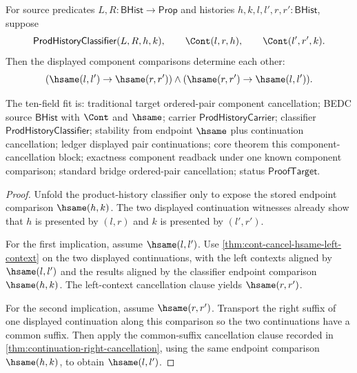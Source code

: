 \begin{theorem}
\label{thm:prod-history-classifier-hsame-component-cancellation}
For source predicates $L,R:\mathsf{BHist}\to\mathsf{Prop}$ and histories
$h,k,l,l',r,r':\mathsf{BHist}$, suppose
$$
\mathsf{ProdHistoryClassifier}(L,R,h,k),
\qquad
\Cont(l,r,h),
\qquad
\Cont(l',r',k).
$$
Then the displayed component comparisons determine each other:
$$
(\hsame(l,l')\to\hsame(r,r'))
\land
(\hsame(r,r')\to\hsame(l,l')).
$$

The ten-field fit is: traditional target ordered-pair component cancellation;
BEDC source $\mathsf{BHist}$ with $\Cont$ and $\hsame$; carrier
$\mathsf{ProdHistoryCarrier}$; classifier $\mathsf{ProdHistoryClassifier}$;
stability from endpoint $\hsame$ plus continuation cancellation; ledger
displayed pair continuations; core theorem this component-cancellation block;
exactness component readback under one known component comparison; standard
bridge ordered-pair cancellation; status $\mathsf{ProofTarget}$.
\end{theorem}
\begin{proof}
Unfold the product-history classifier only to expose the stored endpoint
comparison $\hsame(h,k)$. The two displayed continuation witnesses already show
that $h$ is presented by $(l,r)$ and $k$ is presented by $(l',r')$.

For the first implication, assume $\hsame(l,l')$. Use
\autoref{thm:cont-cancel-hsame-left-context} on the two displayed
continuations, with the left contexts aligned by $\hsame(l,l')$ and the results
aligned by the classifier endpoint comparison $\hsame(h,k)$. The left-context
cancellation clause yields $\hsame(r,r')$.

For the second implication, assume $\hsame(r,r')$. Transport the right suffix
of one displayed continuation along this comparison so the two continuations
have a common suffix. Then apply the common-suffix cancellation clause recorded
in \autoref{thm:continuation-right-cancellation}, using the same endpoint
comparison $\hsame(h,k)$, to obtain $\hsame(l,l')$.
\end{proof}

